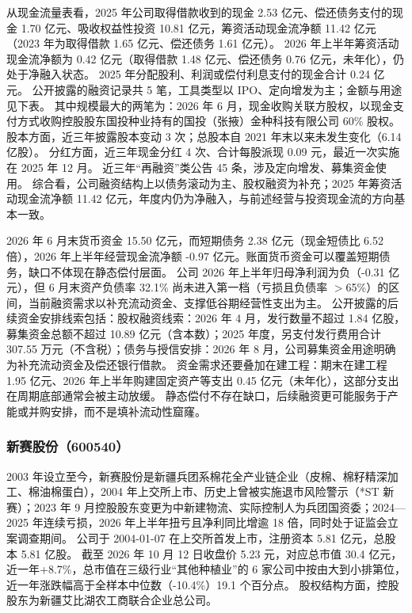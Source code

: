  从现金流量表看，2025 年公司取得借款收到的现金 2.53 亿元、偿还债务支付的现金 1.70 亿元、吸收权益性投资 10.81 亿元，筹资活动现金流净额 11.42 亿元（2023 年为取得借款 1.65 亿元、偿还债务 1.61 亿元）。 2026 年上半年筹资活动现金流净额为 0.42 亿元（取得借款 1.48 亿元、偿还债务 0.76 亿元，未年化），仍处于净融入状态。 2025 年分配股利、利润或偿付利息支付的现金合计 0.24 亿元。 公开披露的融资记录共 5 笔，工具类型以 IPO、定向增发为主；金额与用途见下表。 其中规模最大的两笔为：2026 年 6 月，现金收购关联方股权，以现金支付方式收购控股股东国投种业持有的国投（张掖）金种科技有限公司 60\% 股权。 股本方面，近三年披露股本变动 3 次；总股本自 2021 年末以来未发生变化（6.14 亿股）。 分红方面，近三年现金分红 4 次、合计每股派现 0.09 元，最近一次实施在 2025 年 12 月。 近三年“再融资”类公告 45 条，涉及定向增发、募集资金使用。 综合看，公司融资结构上以债务滚动为主、股权融资为补充；2025 年筹资活动现金流净额 11.42 亿元，年度内仍为净融入，与前述经营与投资现金流的方向基本一致。

 2026 年 6 月末货币资金 15.50 亿元，而短期债务 2.38 亿元（现金短债比 6.52 倍），2026 年上半年经营现金流净额 -0.97 亿元。账面货币资金可以覆盖短期债务，缺口不体现在静态偿付层面。 公司 2026 年上半年归母净利润为负（-0.31 亿元），但 6 月末资产负债率 32.1\% 尚未进入第一档（亏损且负债率 $>$65\%）的区间，当前融资需求以补充流动资金、支撑低谷期经营性支出为主。 公开披露的后续资金安排线索包括：股权融资线索：2026 年 4 月，发行数量不超过 1.84 亿股，募集资金总额不超过 10.89 亿元（含本数）；2025 年度，另支付发行费用合计 307.55 万元（不含税）；债务与授信安排：2026 年 8 月，公司募集资金用途明确为补充流动资金及偿还银行借款。 资金需求还要叠加在建工程：期末在建工程 1.95 亿元、2026 年上半年购建固定资产等支出 0.45 亿元（未年化），这部分支出在周期底部通常会被主动放缓。 静态偿付不存在缺口，后续融资更可能服务于产能或并购安排，而不是填补流动性窟窿。




\subsubsection{新赛股份（600540）}
\label{co:600540}

 2003 年设立至今，新赛股份是新疆兵团系棉花全产业链企业（皮棉、棉籽精深加工、棉油棉蛋白），2004 年上交所上市、历史上曾被实施退市风险警示（*ST 新赛）；2023 年 9 月控股股东变更为中新建物流、实际控制人为兵团国资委；2024—2025 年连续亏损，2026 年上半年扭亏且净利同比增逾 18 倍，同时处于证监会立案调查期间。 公司于 2004-01-07 在上交所首发上市，注册资本 5.81 亿元，总股本 5.81 亿股。 截至 2026 年 10 月 12 日收盘价 5.23 元，对应总市值 30.4 亿元，近一年+8.7\%，总市值在三级行业“其他种植业”的 6 家公司中按由大到小排第位，近一年涨跌幅高于全样本中位数（-10.4\%）19.1 个百分点。 股权结构方面，控股股东为新疆艾比湖农工商联合企业总公司。

